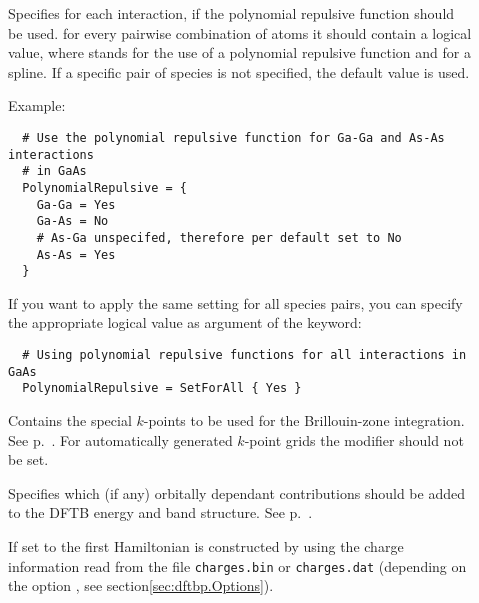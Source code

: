\begin{description}
\item[] Specifies for each interaction, if the
  polynomial repulsive function should be used. for every pairwise
  combination of atoms it should contain a logical value, where
   stands for the use of a polynomial repulsive function and
   for a spline. If a specific pair of species is not
  specified, the default value  is used.

  Example:
\begin{verbatim}
  # Use the polynomial repulsive function for Ga-Ga and As-As interactions
  # in GaAs
  PolynomialRepulsive = {
    Ga-Ga = Yes
    Ga-As = No
    # As-Ga unspecifed, therefore per default set to No
    As-As = Yes
  }
\end{verbatim}

  If you want to apply the same setting for all species pairs, you can
  specify the appropriate logical value as argument of the
   keyword:

\begin{verbatim}
  # Using polynomial repulsive functions for all interactions in GaAs
  PolynomialRepulsive = SetForAll { Yes }
\end{verbatim}

\item[] Contains the
  special $k$-points to be used for the Bril\-louin-zone integration.
  See p.~. For automatically generated
  $k$-point grids the modifier should not be set.

\item[] Specifies which (if any) orbitally
  dependant contributions should be added to the DFTB energy and
  band structure. See p.~.


\item[] If set to  the first Hamiltonian is
  constructed by using the charge information read from the file
  \verb|charges.bin| or \verb|charges.dat| (depending on the option
  , see section\ref{sec:dftbp.Options}).


\end{description}
